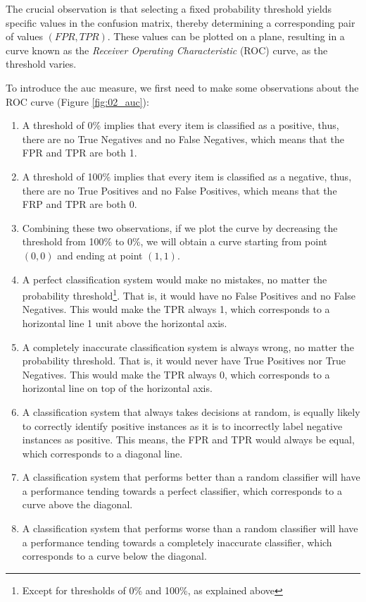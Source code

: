 The crucial observation is that selecting a fixed probability threshold yields specific values in the confusion matrix, thereby determining a corresponding pair of values $(FPR, TPR)$. These values can be plotted on a plane, resulting in a curve known as the \emph{Receiver Operating Characteristic} (ROC) curve, as the threshold varies.

To introduce the \gls{auc} measure, we first need to make some observations  about the ROC curve (Figure \ref{fig:02_auc}):

\begin{enumerate}
    \item A threshold of 0\% implies that every item is classified as a positive, thus, there are no True Negatives and no False Negatives, which means that the FPR and TPR are both 1.

    \item A threshold of 100\% implies that every item is classified as a negative, thus, there are no True Positives and no False Positives, which means that the FRP and TPR are both 0.

    \item Combining these two observations, if we plot the curve by decreasing the threshold from 100\% to 0\%, we will obtain a curve starting from point $(0,0)$ and ending at point $(1,1)$.

    \item A perfect classification system would make no mistakes, no matter the probability threshold\footnote{Except for thresholds of 0\% and 100\%, as explained above}. That is, it would have no False Positives and no False Negatives. This would make the TPR always 1, which corresponds to a horizontal line 1 unit above the horizontal axis. 

    \item A completely inaccurate classification system is always wrong, no matter the probability threshold. That is, it would never have True Positives nor True Negatives. This would make the TPR always 0, which corresponds to a horizontal line on top of the horizontal axis.

    \item A classification system that always takes decisions at random, is equally likely to correctly identify positive instances as it is to incorrectly label negative instances as positive. This means, the FPR and TPR would always be equal, which corresponds to a diagonal line.

    \item A classification system that performs better than a random classifier will have a performance tending towards a perfect classifier, which corresponds to a curve above the diagonal.

    \item A classification system that performs worse than a random classifier will have a performance tending towards a completely inaccurate classifier, which corresponds to a curve below the diagonal.

\end{enumerate}

